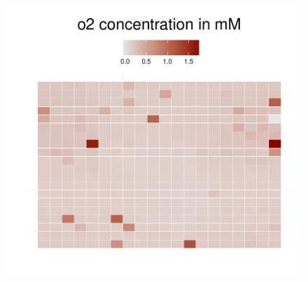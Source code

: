 \begin{figure}[h]
{\begin{minipage}[t]{0.3\textwidth}
  \end{minipage}
  \begin{minipage}[t]{0.3\textwidth}
    \includegraphics[width=\textwidth]{../results/ecoli_20x20_aerob_seed55_o250.pdf}
  \end{minipage}
  }
\end{figure}
